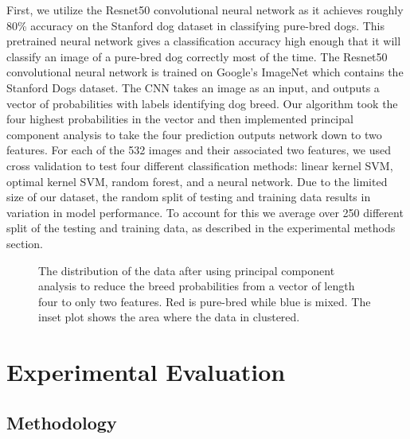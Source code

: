 \documentclass[12pt]{article}
\begin{document}
First, we utilize the Resnet50 convolutional neural network \cite{he2015deep} as it achieves roughly 80\% accuracy on the Stanford dog dataset in classifying pure-bred dogs. This pretrained neural network gives a classification accuracy high enough that it will classify an image of a pure-bred dog correctly most of the time. The Resnet50 convolutional neural network is trained on Google's ImageNet which contains the Stanford Dogs dataset. The CNN takes an image as an input, and outputs a vector of probabilities with labels identifying dog breed. Our algorithm took the four highest probabilities in the vector and then implemented principal component analysis to take the four prediction outputs network down to two features. For each of the 532 images and their associated two features, we used cross validation to test four different classification methods: linear kernel SVM, optimal kernel SVM, random forest, and a neural network. Due to the limited size of our dataset, the random split of testing and training data results in variation in model performance. To account for this we average over 250 different split of the testing and training data, as described in the experimental methods section.

\begin{figure}[H]
\caption{The distribution of the data after using principal component analysis to reduce the breed probabilities from a vector of length four to only two features. Red is pure-bred while blue is mixed. The inset plot shows the area where the data in clustered.}
\end{figure}

\section{Experimental Evaluation}

\subsection{Methodology}
\end{document}
